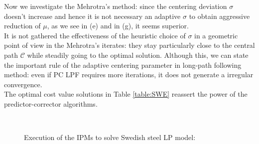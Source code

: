 \documentclass[a4paper,10 pt,titlepage,twoside]{report}
\theoremstyle{plain}
\theoremstyle{definition}
\theoremstyle{remark}
\begin{document}
{{Now we investigate the Mehrotra's method: since the centering deviation $\sigma$ doesn't increase and hence it is not necessary an adaptive $\sigma$ to obtain aggressive reduction of $\mu$, as we see in (e) and in (g), it seems superior.\\
It is not gathered the effectiveness of the heuristic choice of $\sigma$ in a geometric point of view in the Mehrotra's iterates: they stay particularly close to the central path $\mathcal{C}$ while steadily going to the optimal solution. 
Although this, we can state the important rule of the adaptive centering parameter in long-path following method: even if PC LPF requires more iterations, it does not generate a irregular convergence. \\The optimal cost value solutions in Table \ref{table:SWE} reassert the power of the predictor-corrector algorithms.   
\begin{figure}\caption{\label{figure:swe}Execution of the IPMs to solve Swedish steel LP model:}
	 \qquad%
	\\
	 \qquad%

\end{figure}}}
\end{document}
